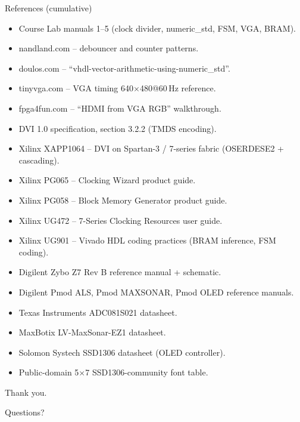 \documentclass[aspectratio=169,10pt]{beamer}
\begin{document}
\begin{frame}{References (cumulative)}
    \scriptsize
    \begin{itemize}
        \item Course Lab manuals 1--5 (clock divider, numeric\_std,
              FSM, VGA, BRAM).
        \item nandland.com -- debouncer and counter patterns.
        \item doulos.com -- ``vhdl-vector-arithmetic-using-numeric\_std''.
        \item tinyvga.com -- VGA timing 640$\times$480@60\,Hz reference.
        \item fpga4fun.com -- ``HDMI from VGA RGB'' walkthrough.
        \item DVI 1.0 specification, section 3.2.2 (TMDS encoding).
        \item Xilinx XAPP1064 -- DVI on Spartan-3 / 7-series fabric
              (OSERDESE2 + cascading).
        \item Xilinx PG065 -- Clocking Wizard product guide.
        \item Xilinx PG058 -- Block Memory Generator product guide.
        \item Xilinx UG472 -- 7-Series Clocking Resources user guide.
        \item Xilinx UG901 -- Vivado HDL coding practices (BRAM
              inference, FSM coding).
        \item Digilent Zybo Z7 Rev B reference manual + schematic.
        \item Digilent Pmod ALS, Pmod MAXSONAR, Pmod OLED reference
              manuals.
        \item Texas Instruments ADC081S021 datasheet.
        \item MaxBotix LV-MaxSonar-EZ1 datasheet.
        \item Solomon Systech SSD1306 datasheet (OLED controller).
        \item Public-domain 5$\times$7 SSD1306-community font table.
    \end{itemize}
\end{frame}

\begin{frame}
    \centering
    \Large Thank you. \par \vspace{6mm}
    \normalsize Questions?
\end{frame}
\end{document}
